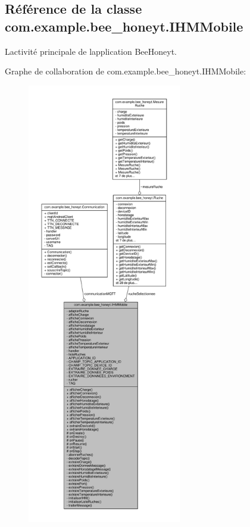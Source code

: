 \hypertarget{classcom_1_1example_1_1bee__honeyt_1_1_i_h_m_mobile}{}\subsection{Référence de la classe com.\+example.\+bee\+\_\+honeyt.\+I\+H\+M\+Mobile}
\label{classcom_1_1example_1_1bee__honeyt_1_1_i_h_m_mobile}


L\textquotesingle{}activité principale de l\textquotesingle{}application Bee\+Honey\textquotesingle{}t.  




Graphe de collaboration de com.\+example.\+bee\+\_\+honeyt.\+I\+H\+M\+Mobile\+:
\nopagebreak
\begin{figure}[H]
\begin{center}
\leavevmode
\includegraphics[height=550pt]{classcom_1_1example_1_1bee__honeyt_1_1_i_h_m_mobile__coll__graph}
\end{center}
\end{figure}
